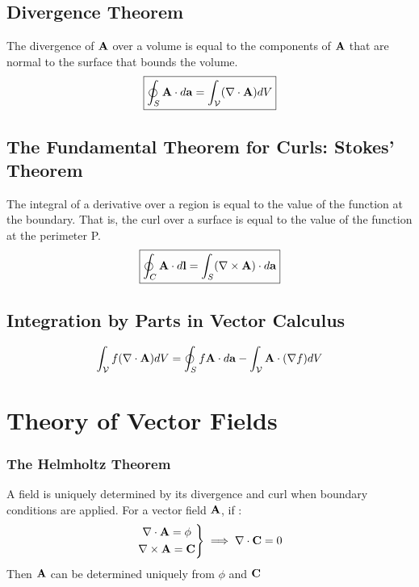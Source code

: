     \subsection*{Divergence Theorem}
        The divergence of \(\vb{A}\) over a volume is equal to the components of \(\vb{A}\) that are normal to the surface that bounds the volume. 
        \begin{align}
            \boxed{\oint_S \vb{A} \da =\int_{\mathcal{V}} (\nabla \cdot \vb{A})dV } 
        \end{align}
    \subsection*{The Fundamental Theorem for Curls: Stokes' Theorem}
        The integral of a derivative over a region is equal to the value of the function at the boundary. That is, the curl over a surface is equal to the value of the function at the perimeter P. 
        \begin{align}
            \boxed{\oint_C \vb{A} \cdot d\vb{l}=\int_{S} (\nabla \times \vb{A}) \cdot d\vb{a}} 
        \end{align}
        \subsection*{Integration by Parts in Vector Calculus}
        \begin{align*}
        \int_{\mathcal{V}} f(\nabla \cdot \vb{A})dV = \oint_S f\vb{A}\da-\int_{\mathcal{V}} \vb{A} \cdot (\nabla f)dV 
        \end{align*}


        \newpage


    \section{Theory of Vector Fields \label{vectorfields}}
    \subsubsection*{The Helmholtz Theorem}
        A field is uniquely determined by its divergence and curl when boundary conditions are applied. For a vector field \(\vb{A}\), if :
        \begin{align*}
            \left.
            \begin{gathered}
            \nabla \cdot \vb{A}= \phi
            \\
            \nabla \times \vb{A}= \vb{C}
            \end{gathered}
            \right\}
            \implies
            \nabla \cdot \vb{C} = 0
        \end{align*}
        Then \(\vb{A}\) can be determined uniquely from $\phi$ and $\vb{C}$
